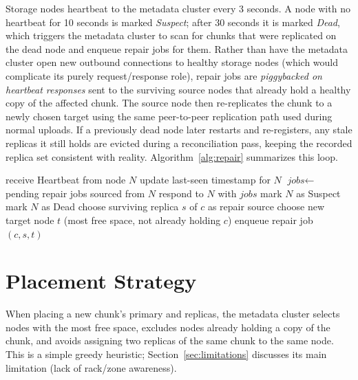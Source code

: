 \documentclass[12pt,a4paper]{report}
\begin{document}
Storage nodes heartbeat to the metadata cluster every 3 seconds. A node with no heartbeat for 10 seconds is marked \emph{Suspect}; after 30 seconds it is marked \emph{Dead}, which triggers the metadata cluster to scan for chunks that were replicated on the dead node and enqueue repair jobs for them. Rather than have the metadata cluster open new outbound connections to healthy storage nodes (which would complicate its purely request/response role), repair jobs are \emph{piggybacked on heartbeat responses} sent to the surviving source nodes that already hold a healthy copy of the affected chunk. The source node then re-replicates the chunk to a newly chosen target using the same peer-to-peer replication path used during normal uploads. If a previously dead node later restarts and re-registers, any stale replicas it still holds are evicted during a reconciliation pass, keeping the recorded replica set consistent with reality. Algorithm~\ref{alg:repair} summarizes this loop.

\begin{algorithm}[h]
\caption{Failure Detection and Repair (Metadata Cluster)}
\label{alg:repair}
\begin{algorithmic}[1]
\Loop
    \State receive Heartbeat from node $N$
    \State update last-seen timestamp for $N$
    \State $\textit{jobs} \gets$ pending repair jobs sourced from $N$ 
    \State respond to $N$ with $\textit{jobs}$
\EndLoop
\Statex
{}
            \State mark $N$ as Suspect
            \State mark $N$ as Dead
                \State choose surviving replica $s$ of $c$ as repair source
                \State choose new target node $t$ (most free space, not already holding $c$)
                \State enqueue repair job $(c, s, t)$
            \EndFor
        \EndIf
    \EndFor
\EndProcedure
\end{algorithmic}
\end{algorithm}

\section{Placement Strategy}

When placing a new chunk's primary and replicas, the metadata cluster selects nodes with the most free space, excludes nodes already holding a copy of the chunk, and avoids assigning two replicas of the same chunk to the same node. This is a simple greedy heuristic; Section~\ref{sec:limitations} discusses its main limitation (lack of rack/zone awareness).
\end{document}
